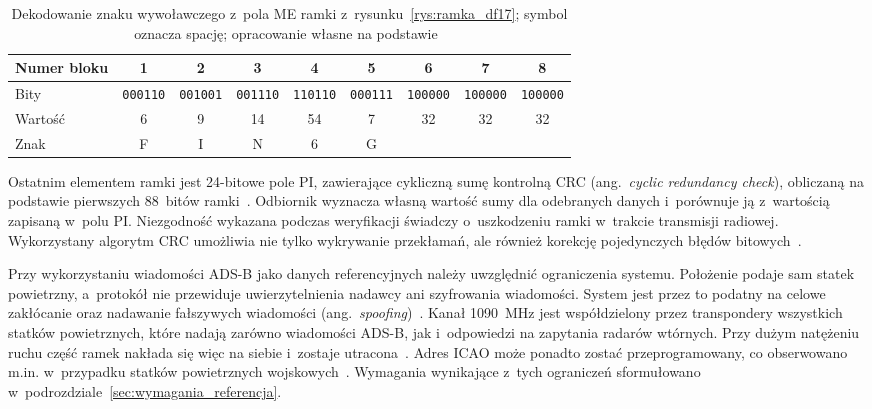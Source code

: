 \begin{table}[htbp]
  \centering
  \caption{Dekodowanie znaku wywoławczego z~pola ME ramki z~rysunku~\ref{rys:ramka_df17}; symbol \textvisiblespace{} oznacza spację; opracowanie własne na podstawie~\cite{sun2021}}
  \label{tab:znak_wywolawczy}
  \small
  \begin{tabular}{@{}lcccccccc@{}}
    \toprule
    Numer bloku & 1 & 2 & 3 & 4 & 5 & 6 & 7 & 8 \\
    \midrule
    Bity    & \texttt{000110} & \texttt{001001} & \texttt{001110} & \texttt{110110} & \texttt{000111} & \texttt{100000} & \texttt{100000} & \texttt{100000} \\
    Wartość & 6 & 9 & 14 & 54 & 7 & 32 & 32 & 32 \\
    Znak    & F & I & N & 6 & G & \textvisiblespace & \textvisiblespace & \textvisiblespace \\
    \bottomrule
  \end{tabular}
\end{table}
\newpage
Ostatnim elementem ramki jest 24-bitowe pole PI, zawierające cykliczną sumę kontrolną CRC (ang.~\textit{cyclic redundancy check}), obliczaną na podstawie pierwszych 88~bitów ramki~\cite{dump1090}. Odbiornik wyznacza własną wartość sumy dla odebranych danych i~porównuje ją z~wartością zapisaną w~polu PI. Niezgodność wykazana podczas weryfikacji świadczy o~uszkodzeniu ramki w~trakcie transmisji radiowej. Wykorzystany algorytm CRC umożliwia nie tylko wykrywanie przekłamań, ale również korekcję pojedynczych błędów bitowych~\cite{sun2021}.

Przy wykorzystaniu wiadomości ADS-B jako danych referencyjnych należy uwzględnić ograniczenia systemu. Położenie podaje sam statek powietrzny, a~protokół nie przewiduje uwierzytelnienia nadawcy ani szyfrowania wiadomości. System jest przez to podatny na celowe zakłócanie oraz nadawanie fałszywych wiadomości (ang.~\textit{spoofing})~\cite{strohmeier2015security}. Kanał \SI{1090}{\mega\hertz} jest współdzielony przez transpondery wszystkich statków powietrznych, które nadają zarówno wiadomości ADS-B, jak i~odpowiedzi na zapytania radarów wtórnych. Przy dużym natężeniu ruchu część ramek nakłada się więc na siebie i~zostaje utracona~\cite{strohmeier2014realities}. Adres ICAO może ponadto zostać przeprogramowany, co obserwowano m.in. w~przypadku statków powietrznych wojskowych~\cite{sun2021}. Wymagania wynikające z~tych ograniczeń sformułowano w~podrozdziale~\ref{sec:wymagania_referencja}.



